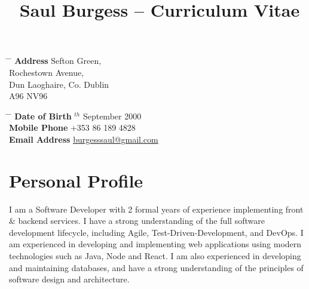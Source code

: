 \documentclass[10pt]{article} %
\begin{document}

\title{Saul Burgess -- Curriculum Vitae} %


\parbox{0.5\textwidth}{ %
    \begin{tabbing} %
        \hspace{3cm} \= \hspace{4cm} \= \kill %
        {\bf Address}  Sefton Green,\\ %
        \> Rochestown Avenue, \\
        \> Dun Laoghaire, Co. Dublin \\ %
        \> A96 NV96 \\
    \end{tabbing}} \hfill %
\parbox{0.5\textwidth}{ %
    \begin{tabbing} %
        \hspace{3cm} \= \hspace{4cm} \= \kill %
        {\bf Date of Birth} $^{th}$ September 2000 \\ %
        {\bf Mobile Phone} \> +353 86 189 4828 \\ %
        {\bf Email Address} \>
        \href{mailto:burgesssaul@gmail.com}{burgesssaul@gmail.com} \\ %
        \end{tabbing}}


\section{Personal Profile}

I am a Software Developer with 2 formal years of experience implementing front
\& backend services. I have a strong understanding of the full software
development lifecycle, including Agile, Test-Driven-Development, and DevOps. I
am experienced in developing and implementing web applications using modern
technologies such as Java, Node and React. I am also experienced in developing
and maintaining databases, and have a strong understanding of the principles of
software design and architecture.
\end{document}
